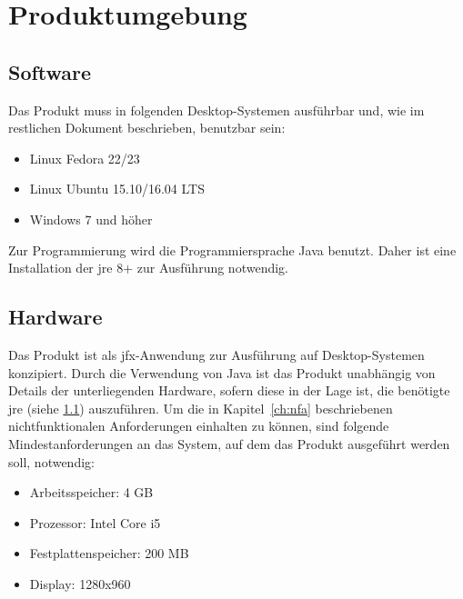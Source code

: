 \chapter{Produktumgebung}
\label{ch:umgebung}

\section{Software}\label{sec:software}
Das Produkt muss in folgenden Desktop-Systemen ausführbar und, wie im restlichen Dokument beschrieben, benutzbar sein:
\begin{itemize}
  \setlength\itemsep{0em}
  \item Linux Fedora 22/23 %
  \item Linux Ubuntu 15.10/16.04 LTS
  \item Windows 7 und höher
\end{itemize}
Zur Programmierung wird die Programmiersprache Java benutzt. Daher ist eine Installation der \gls{jre} 8+ zur Ausführung notwendig.

\section{Hardware}\label{sec:hardware}
Das Produkt ist als \gls{jfx}-Anwendung zur Ausführung auf Desktop-Systemen konzipiert.
Durch die Verwendung von Java ist das Produkt unabhängig von Details der unterliegenden Hardware, sofern diese in der Lage ist, die benötigte \gls{jre} (siehe \ref{sec:software}) auszuführen.
Um die in Kapitel~\ref{ch:nfa} beschriebenen nichtfunktionalen Anforderungen einhalten zu können, sind folgende Mindestanforderungen an das System, auf dem das Produkt ausgeführt werden soll, notwendig:

\begin{itemize}
  \setlength\itemsep{0em}
  \item Arbeitsspeicher: 4 GB
  \item Prozessor: Intel Core i5 %
  \item Festplattenspeicher: 200 MB 
  \item Display: 1280x960
\end{itemize}
